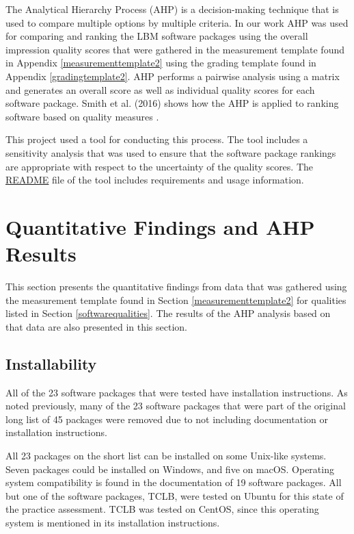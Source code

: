 \documentclass[12pt, notitlepage]{article}
\begin{document}
The Analytical Hierarchy Process (AHP) is a decision-making technique that is used to compare multiple options by multiple criteria. In our work AHP was used for comparing and ranking the LBM software packages using the overall impression quality scores that were gathered in the measurement template found in Appendix \ref{measurementtemplate2} using the grading template found in Appendix \ref{gradingtemplate2}. AHP performs a pairwise analysis using a matrix and generates an overall score as well as individual quality scores for each software package. Smith et al. (2016) shows how the AHP is applied to ranking software based on quality measures \cite{SmithEtAl2016}. 

This project used a tool for conducting this process. The tool includes a sensitivity analysis that was used to ensure that the software package rankings are appropriate with respect to the uncertainty of the quality scores. The \href{https://github.com/smiths/AIMSS/blob/master/StateOfPractice/AHP2020/LBM/README.txt}{README} file of the tool includes requirements and usage information.

\newpage

\section{Quantitative Findings and AHP Results}\label{AHPresults}

This section presents the quantitative findings from data that was gathered using the measurement template found in Section \ref{measurementtemplate2} for qualities listed in Section \ref{softwarequalities}. The results of the AHP analysis based on that data are also presented in this section.

\subsection{Installability}

All of the 23 software packages that were tested have installation instructions. As noted previously, many of the 23 software packages that were part of the original long list of 45 packages were removed due to not including documentation or installation instructions. 

All 23 packages on the short list can be installed on some Unix-like systems. Seven packages could be installed on Windows, and five on macOS. Operating system compatibility is found in the documentation of 19 software packages. All but one of the software packages, TCLB, were tested on Ubuntu for this state of the practice assessment. TCLB was tested on CentOS, since this operating system is mentioned in its installation instructions.
\end{document}
